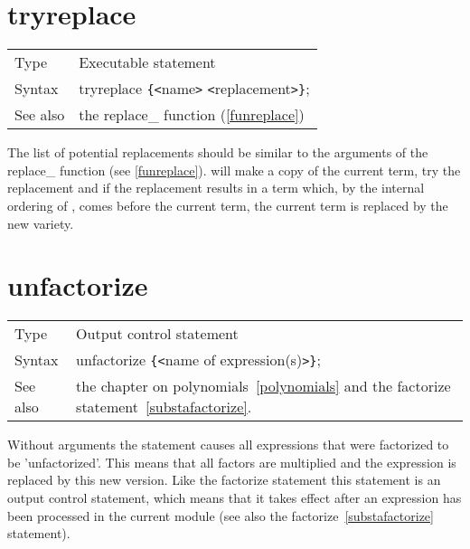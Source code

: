 \vspace{10mm}


\section{tryreplace}
\label{substatryreplace}

\noindent \begin{tabular}{ll}
Type & Executable statement\\
Syntax & tryreplace \verb:{:{\tt<}name{\tt>} {\tt<}replacement{\tt>}\verb:}:;
\\ See also & the replace\_ function (\ref{funreplace})
\end{tabular} \vspace{4mm}

\noindent The list of potential replacements should be 
similar to the arguments of the replace\_ 
function (see \ref{funreplace}). {\FORM} will 
make a copy of the current term, try the replacement and if the replacement 
results in a term which, by the internal ordering of {\FORM}, comes before 
the current term, the current term is replaced by the new variety. 
\vspace{10mm}


\section{unfactorize}
\label{substaunfactorize}

\noindent \begin{tabular}{ll}
Type & Output control statement\\
Syntax & unfactorize \verb:{:{\tt<}name of expression(s){\tt>}\verb:}:;
\\ See also & the chapter on polynomials~\ref{polynomials} and the 
factorize statement~\ref{substafactorize}.
\end{tabular} \vspace{4mm}

\noindent Without arguments the statement causes all expressions that were 
factorized to be 'unfactorized'. This means that all factors are multiplied 
and the expression is replaced by this new version. Like the factorize 
statement this statement is an output control statement, which means that 
it takes effect after an expression has been processed in the current 
module (see also the factorize~\ref{substafactorize} statement).

